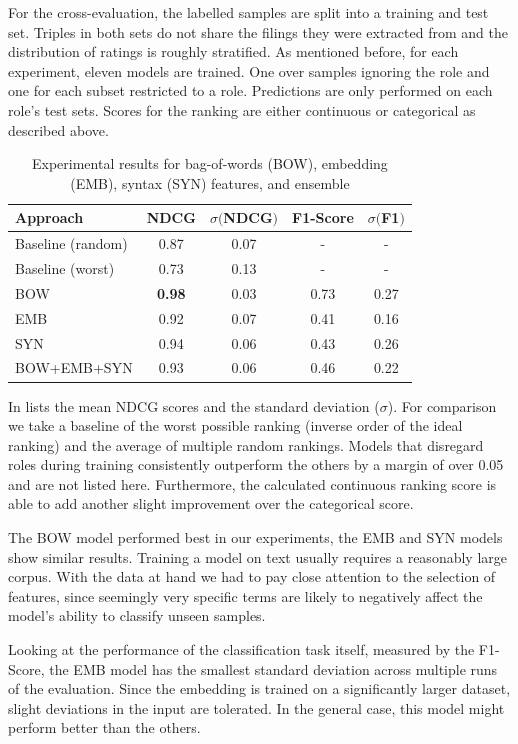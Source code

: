 For the cross-evaluation, the labelled samples are split into a training and test set.
Triples in both sets do not share the filings they were extracted from and the distribution of ratings is roughly stratified.
As mentioned before, for each experiment, eleven models are trained. One over samples ignoring the role and one for each subset restricted to a role.
Predictions are only performed on each role's test sets.
Scores for the ranking are either continuous or categorical as described above.

\begin{table}
	\caption{Experimental results for bag-of-words (BOW), embedding (EMB), syntax (SYN) features, and ensemble}
	\label{tab:results}
	\begin{tabular}{lcccc}
		\toprule
		Approach & NDCG & $\sigma ($NDCG$)$ & F1-Score &  $\sigma ($F1$)$\\
		\midrule
		Baseline (random) & 0.87 & 0.07 & - & - \\
		Baseline (worst)  & 0.73 & 0.13 & - & - \\
		\midrule
		BOW & \textbf{0.98} & 0.03 & 0.73 & 0.27\\
		EMB & 0.92 & 0.07 & 0.41 & 0.16\\
		SYN & 0.94 & 0.06 & 0.43 & 0.26 \\
		BOW+EMB+SYN& 0.93 & 0.06 & 0.46 & 0.22\\
		\bottomrule
	\end{tabular}
\end{table}

In  lists the mean NDCG scores and the standard deviation ($\sigma$).
For comparison we take a baseline of the worst possible ranking (inverse order of the ideal ranking) and the average of multiple random rankings.
Models that disregard roles during training consistently outperform the others by a margin of over 0.05 and are not listed here.
Furthermore, the calculated continuous ranking score is able to add another slight improvement over the categorical score.

The BOW model performed best in our experiments, the EMB and SYN models show similar results. 
Training a model on text usually requires a reasonably large corpus.
With the data at hand we had to pay close attention to the selection of features, since seemingly very specific terms are likely to negatively affect the model's ability to classify unseen samples.

Looking at the performance of the classification task itself, measured by the F1-Score, the EMB model has the smallest standard deviation across multiple runs of the evaluation.
Since the embedding is trained on a significantly larger dataset, slight deviations in the input are tolerated.
In the general case, this model might perform better than the others.

